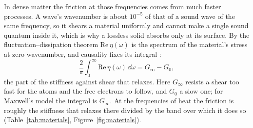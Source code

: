 %
%
%

In dense matter the friction at those frequencies comes from much faster
processes. A wave's wavenumber is about $10^{-5}$ of that of a sound wave of the
same frequency, so it shears a material uniformly and cannot make a single
sound quantum inside it, which is why a lossless solid absorbs only at its
surface. By the
fluctuation--dissipation theorem $\mathrm{Re}\,\eta(\omega)$ is the spectrum of
the material's stress at zero wavenumber, and causality fixes its integral
\cite{SrivastavaWidomPizzella2003}:
\begin{equation}\label{eq:friction-sum}
\frac{2}{\pi}\int_0^\infty \mathrm{Re}\,\eta(\omega)\,\dd\omega = G_\infty - G_0 ,
\end{equation}
the part of the stiffness against shear that relaxes. Here $G_\infty$ resists a
shear too fast for the atoms and the free electrons to follow, and $G_0$ a slow
one; for Maxwell's model the integral is $G_\infty$. At the frequencies of heat
the friction is roughly the stiffness that relaxes there divided by the band
over which it does so (Table~\ref{tab:materials}, Figure~\ref{fig:materials}).

